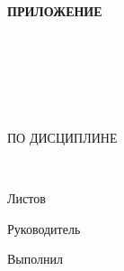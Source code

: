 \begin{ESKDtitlePage}
    \begin{flushright}
        \textbf{ПРИЛОЖЕНИЕ \gpiPrilLetter} \enspace\enspace
    \end{flushright}
    \begin{center}
        \gpiEdu \\
        \gpiKaf \\
    \end{center}

    \vfill

    \begin{center}
        \textbf{\gpiTopic} \\
    \end{center}

    \vfill

    \begin{center}
        \gpiDocTopic \\
        ПО ДИСЦИПЛИНЕ \gpiDiscipline \\
    \end{center}

    \vfill

    \begin{center}
        \textbf{\gpiCode} \\
    \end{center}

    \begin{flushright}
        \begin{minipage}[t]{.45\textwidth}
            Листов \pageref{LastPage} \\
        \end{minipage}
    \end{flushright}

    \vfill

    \begin{flushright}
        \begin{minipage}[t]{.49\textwidth}
            \begin{minipage}[t]{.75\textwidth}
                \begin{flushright}
                    Руководитель

                    \hspace{0pt}

                    Выполнил

                    \hspace{0pt}


\end{flushright}
\end{minipage}
\end{minipage}
\end{flushright}
\end{ESKDtitlePage}
